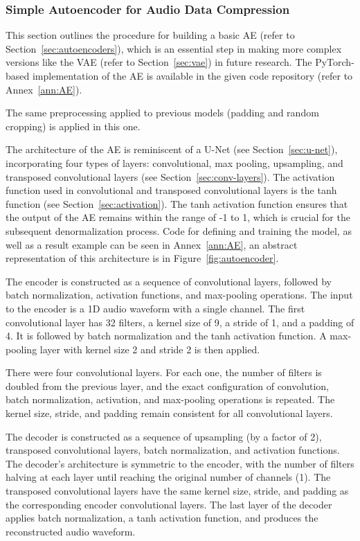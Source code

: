 \subsubsection{Simple Autoencoder for Audio Data Compression}

This section outlines the procedure for building a basic \ac{AE} (refer to Section~\ref{sec:autoencoders}), which is an essential step in making more complex versions like the \ac{VAE} (refer to Section~\ref{sec:vae}) in future research. The PyTorch-based implementation of the \ac{AE} is available in the given code repository (refer to Annex~\ref{ann:AE}).

The same preprocessing applied to previous models (padding and random cropping) is applied in this one.

The architecture of the \ac{AE} is reminiscent of a U-Net (see Section~\ref{sec:u-net}), incorporating four types of layers: convolutional, max pooling, upsampling, and transposed convolutional layers (see Section~\ref{sec:conv-layers}). The activation function used in convolutional and transposed convolutional layers is the \ac{tanh} function (see Section~\ref{sec:activation}). The \ac{tanh} activation function ensures that the output of the \ac{AE} remains within the range of -1 to 1, which is crucial for the subsequent denormalization process. Code for defining and training the model, as well as a result example can be seen in Annex~\ref{ann:AE}, an abstract representation of this architecture is in Figure~\ref{fig:autoencoder}.

The encoder is constructed as a sequence of convolutional layers, followed by batch normalization, activation functions, and max-pooling operations. The input to the encoder is a 1D audio waveform with a single channel. The first convolutional layer has 32 filters, a kernel size of 9, a stride of 1, and a padding of 4. It is followed by batch normalization and the \ac{tanh} activation function. A max-pooling layer with kernel size 2 and stride 2 is then applied. 

There were four convolutional layers. For each one, the number of filters is doubled from the previous layer, and the exact configuration of convolution, batch normalization, activation, and max-pooling operations is repeated. The kernel size, stride, and padding remain consistent for all convolutional layers.

The decoder is constructed as a sequence of upsampling (by a factor of 2), transposed convolutional layers, batch normalization, and activation functions. The decoder's architecture is symmetric to the encoder, with the number of filters halving at each layer until reaching the original number of channels (1). The transposed convolutional layers have the same kernel size, stride, and padding as the corresponding encoder convolutional layers. The last layer of the decoder applies batch normalization, a \ac{tanh} activation function, and produces the reconstructed audio waveform.

